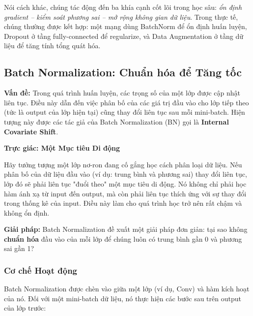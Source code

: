 Nói cách khác, chúng tác động đến ba khía cạnh cốt lõi trong học sâu: 
\textit{ổn định gradient – kiểm soát phương sai – mở rộng không gian dữ liệu}. 
Trong thực tế, chúng thường được kết hợp: một mạng dùng BatchNorm để ổn định huấn luyện, Dropout ở tầng fully-connected để regularize, và Data Augmentation ở tầng dữ liệu để tăng tính tổng quát hóa.

\subsection{Batch Normalization: Chuẩn hóa để Tăng tốc}
\label{subsec:batch_normalization}
\textbf{Vấn đề:} Trong quá trình huấn luyện, các trọng số của một lớp được cập nhật liên tục. Điều này dẫn đến việc phân bố của các giá trị đầu vào cho lớp tiếp theo (tức là output của lớp hiện tại) cũng thay đổi liên tục sau mỗi mini-batch. Hiện tượng này được các tác giả của Batch Normalization (BN) \cite{Ioffe2015} gọi là \textbf{Internal Covariate Shift}.

\begin{mdframed}[style=infobox]
	\textbf{Trực giác: Một Mục tiêu Di động}
	
	Hãy tưởng tượng một lớp nơ-ron đang cố gắng học cách phân loại dữ liệu. Nếu phân bố của dữ liệu đầu vào (ví dụ: trung bình và phương sai) thay đổi liên tục, lớp đó sẽ phải liên tục "đuổi theo" một mục tiêu di động. Nó không chỉ phải học hàm ánh xạ từ input đến output, mà còn phải liên tục thích ứng với sự thay đổi trong thống kê của input. Điều này làm cho quá trình học trở nên rất chậm và không ổn định.
\end{mdframed}

\textbf{Giải pháp:} Batch Normalization đề xuất một giải pháp đơn giản: tại sao không \textbf{chuẩn hóa} đầu vào của mỗi lớp để chúng luôn có trung bình gần 0 và phương sai gần 1?

\subsubsection{Cơ chế Hoạt động}
\label{subsubsec:bn_mechanism}
Batch Normalization được chèn vào giữa một lớp (ví dụ, Conv) và hàm kích hoạt của nó. Đối với một mini-batch dữ liệu, nó thực hiện các bước sau trên output của lớp trước:


